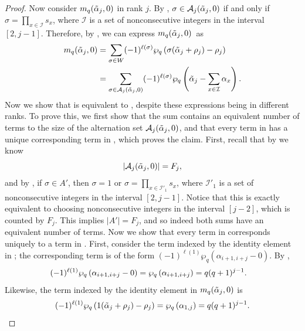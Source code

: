 \documentclass[10pt]{article}
\newcommand{\hr}[0]{\Tilde{\alpha}}
\newcommand{\qpartition}[1]{\wp_q\left(#1\right)}
\begin{document}
\begin{proof}
    Now consider $m_q(\hr_j,0)$ in rank $j$. By , $\sigma\in \mathcal{A}_j(\hr_j,0)$ if and only if $\sigma=\prod_{x\in\mathcal{I}}s_x$, where $\mathcal{I}$ is a set of nonconsecutive integers in the interval $[2,j-1]$. Therefore, by , we can express $m_q(\hr_j,0)$~as 
    \begin{align}
        m_q(\hr_j,0) &= \sum_{\sigma\in W} (-1)^{\ell(\sigma)}\qpartition{\sigma(\hr_j+\rho_j)-\rho_j} \notag\\
        &= \sum_{\sigma\in\mathcal{A}_j(\hr_j,0)} (-1)^{\ell(\sigma)}\qpartition{\hr_{j}-\sum_{x\in\mathcal{I}}\alpha_x}. \label{thing to match to}
    \end{align}
    Now we show that  is equivalent to , despite these expressions being in different ranks. 
    To prove this, we first show that the sum contains an equivalent number of terms to the size of the alternation set $\mathcal{A}_j(\hr_j,0)$,
    and that every term in  has a unique corresponding term in , which proves the claim.  
    First, recall that by  we know 
    \[|\mathcal{A}_j(\hr_j,0)|=F_j,\]
    and by , if $\sigma\in A'$, then $\sigma=1$ or $\sigma=\prod_{x\in\mathcal{I}'_1}s_x$, where $\mathcal{I}'_1$ is a set of nonconsecutive integers in the interval $[2,j-1]$. Notice that this is exactly equivalent to choosing nonconsecutive integers in the interval $[j-2]$, which is counted by $F_j$. This implies $|A'|=F_j$, and so indeed both sums have an equivalent number of terms. 
    Now we show that every term in  corresponds uniquely to a term in . 
    First, consider the term indexed by the identity element in ; the corresponding term is of the form $(-1)^{\ell(1)}\qpartition{\alpha_{i+1,i+j}-0}$.  
    By , 
    \begin{align}
        (-1)^{\ell(1)}\qpartition{\alpha_{i+1,i+j}-0} &=
        \qpartition{\alpha_{i+1,i+j}} = q(q+1)^{j-1}. \notag
    \end{align}
    Likewise, the term indexed by the identity element in $m_q(\hr_j,0)$  is
    \begin{equation}
        (-1)^{\ell(1)}\qpartition{1(\hr_j+\rho_j)-\rho_j} = \qpartition{\alpha_{1,j}}= q(q+1)^{j-1}.\notag
    \end{equation}

\end{proof}
\end{document}
